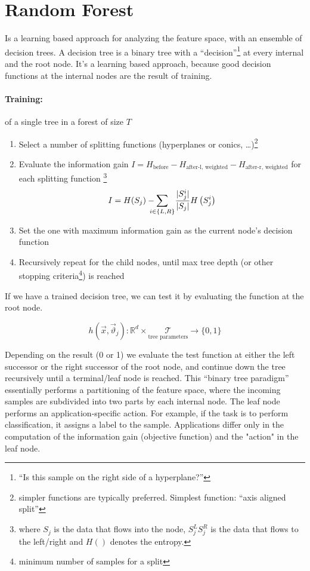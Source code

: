 
\section{Random Forest}

Is a learning based approach for analyzing the feature space, with an ensemble of decision trees. A decision tree is a binary tree with a ``decision''\footnote{``Is this sample on the right side of a hyperplane?''} at every internal and the root node. It's a learning based approach, because good decision functions at the internal nodes are the result of training.


\paragraph{Training:} of a single tree in a forest of size $T$
\begin{enumerate}
  \item Select a number of splitting functions (\eg hyperplanes or conics, \dots)\footnote{simpler functions are typically preferred. Simplest function: ``axis aligned split''}
  \item Evaluate the information gain $I = H_{\text{before}} - H_{\text{after-l, weighted}} - H_{\text{after-r, weighted}}$ for each splitting function \footnote{where \(S_j\) is the data that flows into the node, \(S^L_j S^R_j\) is the data that flows to the left/right and \(H()\) denotes the entropy.}
  \[I = H(S_j) - \sum_{\mathclap{i \in \{L,R\}}}\ \ \frac{|S^i_j|}{|S_j|} H\left(S^i_j\right)\]
  \item Set the one with maximum information gain as the current node's decision function
  \item Recursively repeat for the child nodes, until max tree depth (or other stopping criteria\footnote{minimum number of samples for a split}) is reached
\end{enumerate}

If we have a trained decision tree, we can test it by evaluating the function at the root node.

\[h(\vec{x}, \vec{\vartheta}_j): \mathbb{R}^d \times \underset{\text{tree parameters}}{\mathcal{T}} \rightarrow \{0, 1\}\]

Depending on the result (0 or 1) we evaluate the test function at either the left successor or the right successor of the root node, and continue down the tree recursively until a terminal/leaf node is reached. This ``binary tree paradigm'' essentially performs a partitioning of the feature space, where the incoming samples are subdivided into two parts by each internal node.
The leaf node performs an application-specific action. For example, if the task is to perform classification, it assigns a label to the sample. Applications differ only in the computation of the information gain (objective function) and the "action" in the leaf node.

